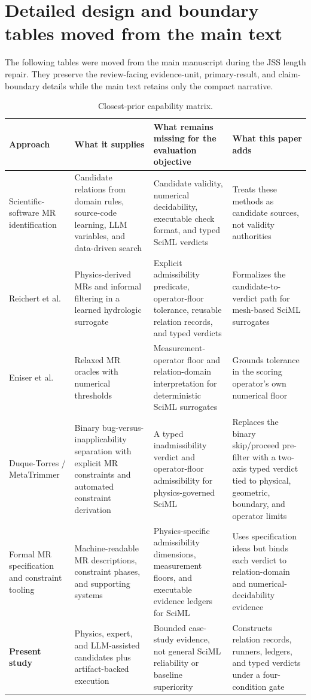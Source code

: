 \documentclass[preprint,12pt]{elsarticle}
\begin{document}
\section{Detailed design and boundary tables moved from the main text}
\label{app:moved-main-tables}

The following tables were moved from the main manuscript during the JSS length repair. They preserve the review-facing evidence-unit, primary-result, and claim-boundary details while the main text retains only the compact narrative.

\begin{table}[!htbp]
\centering\footnotesize
\caption{Closest-prior capability matrix.}
\label{tab:closest-prior-positioning-supp}
\renewcommand{\arraystretch}{0.82}
\begin{tabularx}{\textwidth}{@{}>{\raggedright\arraybackslash}p{}YYY@{}}
\toprule
Approach & What it supplies & What remains missing for the evaluation objective & What this paper adds \\
\midrule
Scientific-software MR identification & Candidate relations from domain rules, source-code learning, LLM variables, and data-driven search & Candidate validity, numerical decidability, executable check format, and typed SciML verdicts & Treats these methods as candidate sources, not validity authorities \\
Reichert et al. & Physics-derived MRs and informal filtering in a learned hydrologic surrogate & Explicit admissibility predicate, operator-floor tolerance, reusable relation records, and typed verdicts & Formalizes the candidate-to-verdict path for mesh-based SciML surrogates \\
Eniser et al. & Relaxed MR oracles with numerical thresholds & Measurement-operator floor and relation-domain interpretation for deterministic SciML surrogates & Grounds tolerance in the scoring operator's own numerical floor \\
Duque-Torres / MetaTrimmer & Binary bug-versus-inapplicability separation with explicit MR constraints and automated constraint derivation & A typed inadmissibility verdict and operator-floor admissibility for physics-governed SciML & Replaces the binary skip/proceed pre-filter with a two-axis typed verdict tied to physical, geometric, boundary, and operator limits \\
Formal MR specification and constraint tooling & Machine-readable MR descriptions, constraint phases, and supporting systems & Physics-specific admissibility dimensions, measurement floors, and executable evidence ledgers for SciML & Uses specification ideas but binds each verdict to relation-domain and numerical-decidability evidence \\
\textbf{Present study} & Physics, expert, and LLM-assisted candidates plus artifact-backed execution & Bounded case-study evidence, not general SciML reliability or baseline superiority & Constructs relation records, runners, ledgers, and typed verdicts under a four-condition gate \\
\bottomrule
\end{tabularx}
\end{table}
\end{document}
